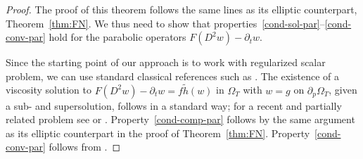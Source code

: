 \documentclass[11pt,oneside,english]{amsart}
\numberwithin{equation}{section}
\theoremstyle{plain}
\numberwithin{equation}{section}
\begin{document}
\begin{proof}  
The proof of this theorem follows the same lines as its elliptic counterpart, Theorem~\ref{thm:FN}. We thus need to show that properties~\ref{cond-sol-par}--\ref{cond-conv-par} hold for the parabolic operators $F(D^2w) - \partial_t w$. 

Since the starting point of our approach is to work with regularized scalar  problem, we can use standard classical references such as \cite{CrandallIshiiLions1992, Ishii1987}.
The existence of a viscosity solution to
$F(D^2w)-\partial_t w = f\tilde h(w)$ in $\Omega_T$ with
$w=g$ on $\partial_p\Omega_T$, given a sub- and supersolution,
follows in a standard way;  for a recent and partially related problem see \cite[Section 3]{AraSaUrb24} or  \cite[Theorem~3.1]{RTU}.
Property~\ref{cond-comp-par} follows by the same argument as its
elliptic counterpart in the proof of Theorem~\ref{thm:FN}.
Property~\ref{cond-conv-par} follows from \cite[Theorem~5.1]{RTU}.



\end{proof}
\end{document}
